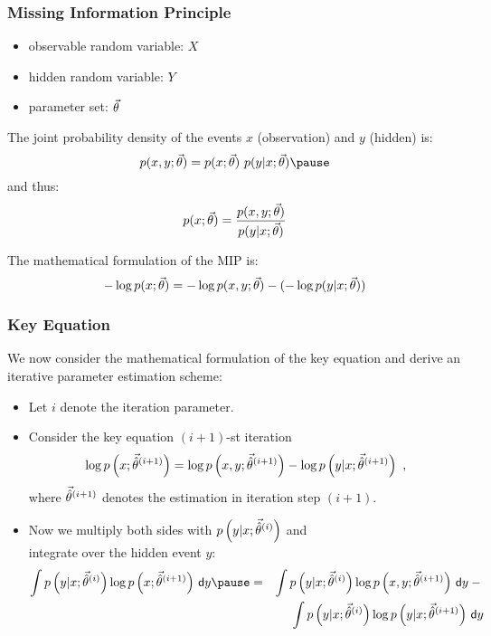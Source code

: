 \begin{frame}
  \frametitle{Missing Information Principle \cont}


  \begin{itemize}
    \item observable random variable: $X$
    \item hidden random variable: $Y$
    \item parameter set: $\vec{\theta}$ \\[0.25cm]
  \end{itemize}
  \pspread
  
  The joint probability density of the events $x$ (observation) and $y$ (hidden) is:
  \begin{displaymath}
    p(x,y; \p) = p(x; \p)\  p(y | x; \p) \pause
  \end{displaymath}
%
  and thus:
  \begin{displaymath}
    p(x; \vec{\theta})= \frac{p(x, y; \vec{\theta})}{p(y|x; \vec{\theta})}
  \end{displaymath}
  \pause
  
  \vspace*{0.25cm}
  The mathematical formulation of the MIP is:
  \begin{displaymath}
    -\log p(x; \vec{\theta}) = -\log p(x, y; \vec{\theta}) -(-\log p(y|x; \vec{\theta}))
  \end{displaymath}
\end{frame}


\begin{frame}
  \frametitle{Key Equation}

  We now consider the mathematical formulation of the key equation and derive an iterative parameter estimation scheme: \pause

  \begin{itemize}
   \item Let $i$ denote the iteration parameter. \pause 
   \item Consider the key equation $(i+1)$-st iteration
     {\small
       \begin{displaymath}
         \log p\left(x    ; \vec{\hat{\theta}}^{(i+1)} \right) =
         \log p\left(x, y ; \vec{\hat{\theta}}^{(i+1)} \right) -
         \log p\left(y|x  ; \vec{\hat{\theta}}^{(i+1)} \right)~,
       \end{displaymath}
     }
     where $\vec{\hat{\theta}}^{(i+1)}$ denotes the estimation in iteration step $(i+1)$. \pause
   \item Now we multiply both sides with $p\left( y|x ; \vec{\hat{\theta}}^{(i)} \right)$ and \\
     integrate over the hidden event $y$:
     \footnotesize
     \begin{eqnarray*}
             \int p\left(y|x ; \hatp^{(i)} \right) \log p\left( x ;   \hatp^{(i+1)} \right)\, \mathsf{d}y \pause
         &=& \int p\left(y|x ; \hatp^{(i)} \right) \log p\left(x, y ; \hatp^{(i+1)} \right)\, \mathsf{d}y -{} \\
         & & \int p\left(y|x ; \hatp^{(i)} \right) \log p\left(y|x  ; \hatp^{(i+1)} \right)\, \mathsf{d}y
     \end{eqnarray*}
  \end{itemize}
\end{frame}


